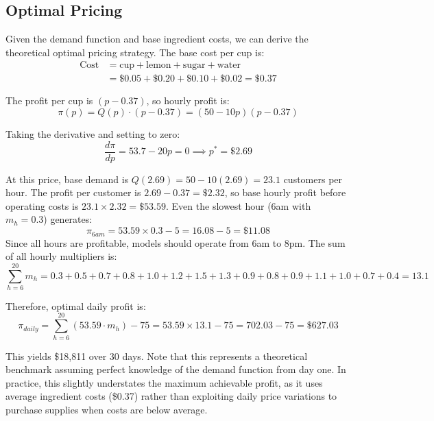 \documentclass[11pt]{article}
\begin{document}
\subsection{Optimal Pricing}

Given the demand function and base ingredient costs, we can derive the theoretical optimal pricing strategy. The base cost per cup is:
\begin{align}
\text{Cost} &= \text{cup} + \text{lemon} + \text{sugar} + \text{water}\\
&= \$0.05 + \$0.20 + \$0.10 + \$0.02 = \$0.37
\end{align}

The profit per cup is $(p - 0.37)$, so hourly profit is:
\begin{equation}
\pi(p) = Q(p) \cdot (p - 0.37) = (50 - 10p)(p - 0.37)
\end{equation}

Taking the derivative and setting to zero:
\begin{equation}
\frac{d\pi}{dp} = 53.7 - 20p = 0 \implies p^* = \$2.69
\end{equation}

At this price, base demand is $Q(2.69) = 50 - 10(2.69) = 23.1$ customers per hour. The profit per customer is $2.69 - 0.37 = \$2.32$, so base hourly profit before operating costs is $23.1 \times
2.32 = \$53.59$. Even the slowest hour (6am with $m_h = 0.3$) generates:
\begin{equation}
\pi_{6am} = 53.59 \times 0.3 - 5 = 16.08 - 5 = \$11.08
\end{equation}
Since all hours are profitable, models should operate from 6am to 8pm. The sum of all hourly multipliers is:
\begin{equation}
\sum_{h=6}^{20} m_h = 0.3 + 0.5 + 0.7 + 0.8 + 1.0 + 1.2 + 1.5 + 1.3 + 0.9 + 0.8 + 0.9 + 1.1 + 1.0 + 0.7 + 0.4 = 13.1
\end{equation}

Therefore, optimal daily profit is:
\begin{equation}
\pi_{daily} = \sum_{h=6}^{20} (53.59 \cdot m_h) - 75 = 53.59 \times 13.1 - 75 = 702.03 - 75 = \$627.03
\end{equation}

This yields \$18,811 over 30 days.
Note that this represents a theoretical benchmark assuming perfect knowledge of the demand function from day one.
In practice, this slightly understates the maximum achievable profit, as it uses average ingredient costs (\$0.37) rather than exploiting daily price variations to purchase supplies when costs are below average.
\end{document}
